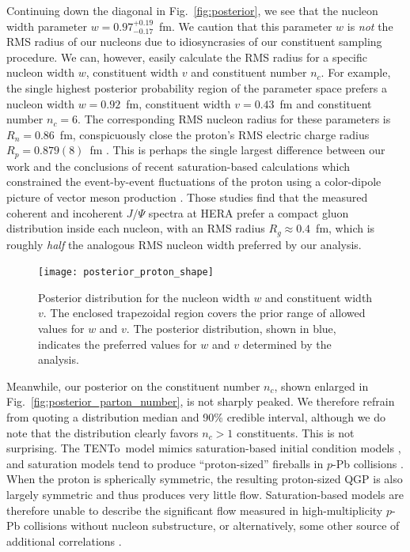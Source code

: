 \documentclass[aps,prc,reprint,amsmath,nofootinbib]{revtex4-1}
\newcommand{\trento}{T\raisebox{-0.5ex}{R}ENTo}
\begin{document}
Continuing down the diagonal in Fig.~\ref{fig:posterior}, we see that the nucleon width parameter $w=0.97_{-0.17}^{+0.19}$~fm.
We caution that this parameter $w$ is \emph{not} the RMS radius of our nucleons due to idiosyncrasies of our constituent sampling procedure.
We can, however, easily calculate the RMS radius for a specific nucleon width $w$, constituent width $v$ and constituent number $n_c$.
For example, the single highest posterior probability region of the parameter space prefers a nucleon width $w=0.92$~fm, constituent width $v=0.43$~fm and constituent number $n_c=6$.
The corresponding RMS nucleon radius for these parameters is $R_n = 0.86$~fm, conspicuously close the proton's RMS electric charge radius $R_p = 0.879(8)$~fm \cite{Bernauer:2010wm}.
This is perhaps the single largest difference between our work and the conclusions of recent saturation-based calculations which constrained the event-by-event fluctuations of the proton using a color-dipole picture of vector meson production \cite{Mantysaari:2016ykx, Mantysaari:2016jaz}.
Those studies find that the measured coherent and incoherent $J/\Psi$ spectra at HERA prefer a compact gluon distribution inside each nucleon, with an RMS radius $R_g \approx 0.4$~fm, which is roughly \emph{half} the analogous RMS nucleon width preferred by our analysis.

\begin{figure}
  \texttt{[image: posterior\_proton\_shape]}
  \caption{
    \label{fig:posterior_proton_shape}
    Posterior distribution for the nucleon width $w$ and constituent width $v$.
    The enclosed trapezoidal region covers the prior range of allowed values for $w$ and $v$.
    The posterior distribution, shown in blue, indicates the preferred values for $w$ and $v$ determined by the analysis.
  }
\end{figure}

Meanwhile, our posterior on the constituent number $n_c$, shown enlarged in Fig.~\ref{fig:posterior_parton_number}, is not sharply peaked.
We therefore refrain from quoting a distribution median and 90\% credible interval, although we do note that the distribution clearly favors $n_c > 1$ constituents.
This is not surprising.
The \trento\ model mimics saturation-based initial condition models \cite{Bernhard:2016tnd}, and saturation models tend to produce ``proton-sized'' fireballs in $p$-Pb collisions \cite{Bzdak:2013zma}.
When the proton is spherically symmetric, the resulting proton-sized QGP is also largely symmetric and thus produces very little flow.
Saturation-based models are therefore unable to describe the significant flow measured in high-multiplicity $p$-Pb collisions without nucleon substructure, or alternatively, some other source of additional correlations \cite{Schenke:2017bog}.
\end{document}
